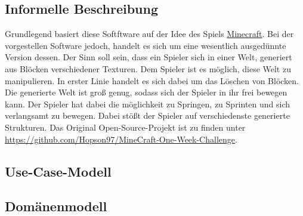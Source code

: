 \documentclass{article}
\begin{document}
\subsection{Informelle Beschreibung} \label{subsec:inf}

Grundlegend basiert diese Softftware auf der Idee des Spiels \href{https://www.minecraft.net}{Minecraft}. Bei der vorgestellen Software jedoch, handelt es sich um eine wesentlich ausgedünnte Version dessen. Der Sinn soll sein, dass ein Spieler sich in einer Welt, generiert aus Blöcken verschiedener Texturen. Dem Spieler ist es möglich, diese Welt zu manipulieren. In erster Linie handelt es sich dabei um das Löschen von Blöcken. Die generierte Welt ist groß genug, sodass sich der Spieler in ihr frei bewegen kann. Der Spieler hat dabei die möglichkeit zu Springen, zu Sprinten und sich verlangsamt zu bewegen. Dabei stößt der Spieler auf verschiedenste generierte Strukturen. Das Original Open-Source-Projekt ist zu finden unter \url{https://github.com/Hopson97/MineCraft-One-Week-Challenge}.

\subsection{Use-Case-Modell} \label{subsec:usecase}


\subsection{Domänenmodell} \label{subsec:domain}

\end{document}
